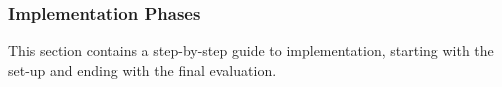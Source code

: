 \subsubsection*{Implementation Phases}\label{implementation_phases}
This section contains a step-by-step guide to implementation, starting with the set-up and ending with the final evaluation.
%	

